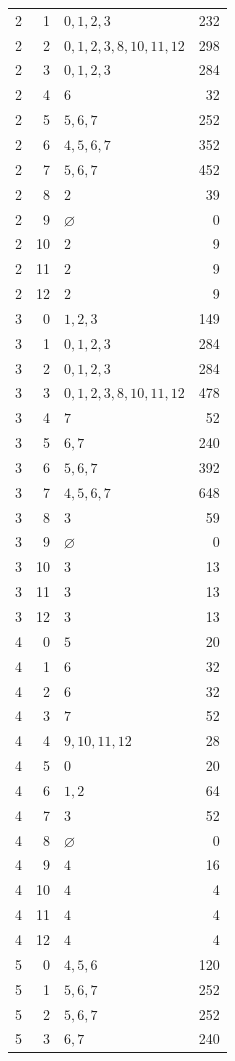 \begin{longtable}{rrlr}
2 & 1 & $0,1,2,3$ & 232\\
2 & 2 & $0,1,2,3,8,10,11,12$ & 298\\
2 & 3 & $0,1,2,3$ & 284\\
2 & 4 & $6$ & 32\\
2 & 5 & $5,6,7$ & 252\\
2 & 6 & $4,5,6,7$ & 352\\
2 & 7 & $5,6,7$ & 452\\
2 & 8 & $2$ & 39\\
2 & 9 & $\varnothing$ & 0\\
2 & 10 & $2$ & 9\\
2 & 11 & $2$ & 9\\
2 & 12 & $2$ & 9\\
3 & 0 & $1,2,3$ & 149\\
3 & 1 & $0,1,2,3$ & 284\\
3 & 2 & $0,1,2,3$ & 284\\
3 & 3 & $0,1,2,3,8,10,11,12$ & 478\\
3 & 4 & $7$ & 52\\
3 & 5 & $6,7$ & 240\\
3 & 6 & $5,6,7$ & 392\\
3 & 7 & $4,5,6,7$ & 648\\
3 & 8 & $3$ & 59\\
3 & 9 & $\varnothing$ & 0\\
3 & 10 & $3$ & 13\\
3 & 11 & $3$ & 13\\
3 & 12 & $3$ & 13\\
4 & 0 & $5$ & 20\\
4 & 1 & $6$ & 32\\
4 & 2 & $6$ & 32\\
4 & 3 & $7$ & 52\\
4 & 4 & $9,10,11,12$ & 28\\
4 & 5 & $0$ & 20\\
4 & 6 & $1,2$ & 64\\
4 & 7 & $3$ & 52\\
4 & 8 & $\varnothing$ & 0\\
4 & 9 & $4$ & 16\\
4 & 10 & $4$ & 4\\
4 & 11 & $4$ & 4\\
4 & 12 & $4$ & 4\\
5 & 0 & $4,5,6$ & 120\\
5 & 1 & $5,6,7$ & 252\\
5 & 2 & $5,6,7$ & 252\\
5 & 3 & $6,7$ & 240\\

\end{longtable}

